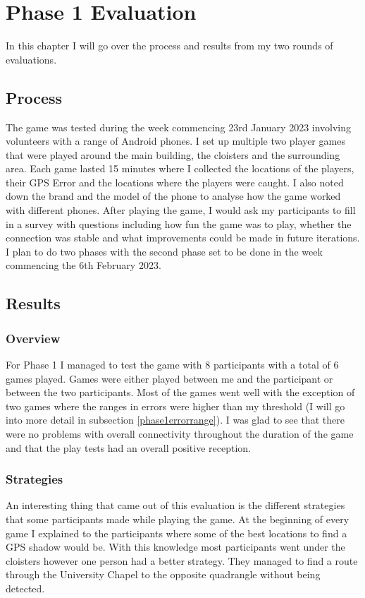 \documentclass{l4proj}
\begin{document}
\chapter{Phase 1 Evaluation}
\label{Evaluation} 

In this chapter I will go over the process and results from my two rounds of evaluations.

\section{Process}
The game was tested during the week commencing 23rd January 2023 involving volunteers with a range of Android phones. I set up multiple two player
games that were played around the main building, the cloisters and the surrounding area. Each game lasted 15 minutes where I collected the locations
of the players, their GPS Error and the locations where the players were caught. I also noted down the brand and the model of the phone to analyse
how the game worked with different phones. After playing the game, I would ask my participants to fill in a survey with questions including how
fun the game was to play, whether the connection was stable and what improvements could be made in future iterations. I plan to do two phases
with the second phase set to be done in the week commencing the 6th February 2023.

\section{Results}
\label{phase1}

\subsection{Overview}
For Phase 1 I managed to test the game with 8 participants with a total of 6 games played. Games were either played between me and the participant
or between the two participants. Most of the games went well with the exception of two games where the ranges in errors were higher than my threshold
(I will go into more detail in subsection \ref{phase1errorrange}). I was glad to see that there were no problems with overall connectivity throughout
the duration of the game and that the play tests had an overall positive reception.

\subsection{Strategies}
An interesting thing that came out of this evaluation is the different strategies that some participants made while playing the game. At the beginning
of every game I explained to the participants where some of the best locations to find a GPS shadow would be. With this knowledge most participants
went under the cloisters however one person had a better strategy. They managed to find a route through the University Chapel to the opposite
quadrangle without being detected.
\end{document}
